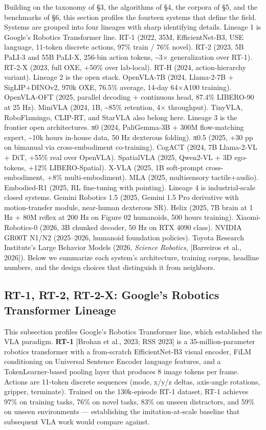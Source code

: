 Building on the taxonomy of §3, the algorithms of §4, the corpora of §5, and the benchmarks of §6, this section profiles the fourteen systems that define the field. Systems are grouped into four lineages with sharp identifying details. Lineage 1 is Google's Robotics Transformer line. RT-1 (2022, 35M, EfficientNet-B3, USE language, 11-token discrete actions, 97\% train / 76\% novel). RT-2 (2023, 5B PaLI-3 and 55B PaLI-X, 256-bin action tokens, \textasciitilde3× generalization over RT-1). RT-2-X (2023, full OXE, +50\% over lab-local). RT-H (2024, action-hierarchy variant). Lineage 2 is the open stack. OpenVLA-7B (2024, Llama-2-7B + SigLIP+DINOv2, 970k OXE, 76.5\% average, 14-day 64×A100 training). OpenVLA-OFT (2025, parallel decoding + continuous head, 87.4\% LIBERO-90 at 25 Hz). MiniVLA (2024, 1B, \textasciitilde85\% retention, 4× throughput). TinyVLA, RoboFlamingo, CLIP-RT, and StarVLA also belong here. Lineage 3 is the frontier open architectures. π0 (2024, PaliGemma-3B + 300M flow-matching expert, \textasciitilde10k hours in-house data, 50 Hz dexterous folding). π0.5 (2025, +30 pp on bimanual via cross-embodiment co-training). CogACT (2024, 7B Llama-2-VL + DiT, +55\% real over OpenVLA). SpatialVLA (2025, Qwen2-VL + 3D ego-tokens, +12\% LIBERO-Spatial). X-VLA (2025, 1B soft-prompt cross-embodiment, +8\% multi-embodiment). MLA (2025, multisensory tactile+audio). Embodied-R1 (2025, RL fine-tuning with pointing). Lineage 4 is industrial-scale closed systems. Gemini Robotics 1.5 (2025, Gemini 1.5 Pro derivative with motion-transfer module, near-human dexterous SR). Helix (2025, 7B brain at 1 Hz + 80M reflex at 200 Hz on Figure 02 humanoids, 500 hours training). Xiaomi-Robotics-0 (2026, 3B chunked decoder, 50 Hz on RTX 4090 class). NVIDIA GR00T N1/N2 (2025--2026, humanoid foundation policies). Toyota Research Institute's Large Behavior Models (2026, \emph{Science Robotics}, {[}Barreiros et al., 2026{]}). Below we summarize each system's architecture, training corpus, headline numbers, and the design choices that distinguish it from neighbors.

\subsection{RT-1, RT-2, RT-2-X: Google's Robotics Transformer Lineage}\label{rt-1-rt-2-rt-2-x-googles-robotics-transformer-lineage}

This subsection profiles Google's Robotics Transformer line, which established the VLA paradigm. \textbf{RT-1} {[}Brohan et al., 2023; RSS 2023{]} is a 35-million-parameter robotics transformer with a from-scratch EfficientNet-B3 visual encoder, FiLM conditioning on Universal Sentence Encoder language features, and a TokenLearner-based pooling layer that produces 8 image tokens per frame. Actions are 11-token discrete sequences (mode, x/y/z deltas, axis-angle rotations, gripper, terminate). Trained on the 130k-episode RT-1 dataset, RT-1 achieves 97\% on training tasks, 76\% on novel tasks, 83\% on unseen distractors, and 59\% on unseen environments --- establishing the imitation-at-scale baseline that subsequent VLA work would compare against.

